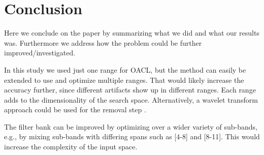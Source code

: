 \section{Conclusion}
Here we conclude on the paper by summarizing what we did and what our results was. Furthermore we address how the problem could be further improved/investigated.

In this study we used just one range for OACL, but the method can easily be extended to use and optimize multiple ranges. That would likely increase the accuracy further, since different artifacts show up in different ranges. Each range adds to the dimensionality of the search space. Alternatively, a wavelet transform approach could be used for the removal step \citep{krishnaveni2006automatic}.

The filter bank can be improved by optimizing over a wider variety of sub-bands, e.g., by mixing sub-bands with differing spans such as [4-8] and [8-11]. This would increase the complexity of the input space.